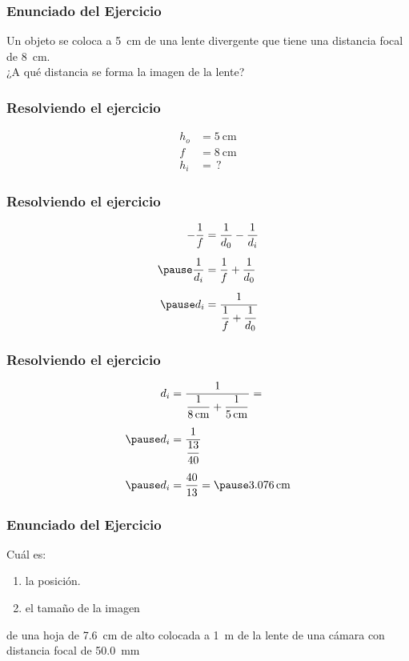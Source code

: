 \documentclass[14pt]{beamer}
\begin{document}
\begin{frame}
\frametitle{Enunciado del Ejercicio}
Un objeto se coloca a \SI{5}{\centi\meter} de una lente divergente que tiene una distancia focal de \SI{8}{\centi\meter}.
\\
\bigskip
\pause
¿A qué distancia se forma la imagen de la lente?
\end{frame}
\begin{frame}
\frametitle{Resolviendo el ejercicio}
\pause
\begin{align*}
h_{o} &= \SI{5}{\centi\meter} \\
f &= \SI{8}{\centi\meter} \\
h_{i} &= \, ?
\end{align*}
\end{frame}
\begin{frame}
\frametitle{Resolviendo el ejercicio}
\pause
\begin{eqnarray*}
\begin{aligned}
- \dfrac{1}{f} &= \dfrac{1}{d_{0}} - \dfrac{1}{d_{i}} \\[0.5em] \pause
\dfrac{1}{d_{i}} &= \dfrac{1}{f} + \dfrac{1}{d_{0}} \\[0.5em] \pause
d_{i} &= \dfrac{1}{\dfrac{1}{f} + \dfrac{1}{d_{0}}} 
\end{aligned}
\end{eqnarray*}
\end{frame}
\begin{frame}
\frametitle{Resolviendo el ejercicio}
\pause
\begin{eqnarray*}
\begin{aligned}
d_{i} &= \dfrac{1}{\dfrac{1}{\SI{8}{\centi\meter}} + \dfrac{1}{\SI{5}{\centi\meter}}} = \\[0.5em] \pause 
d_{i} &= \dfrac{1}{\dfrac{13}{40}} \\[0.5em] \pause 
d_{i} &= \dfrac{40}{13} = \pause \SI{3.076}{\centi\meter}
\end{aligned}
\end{eqnarray*}
\end{frame}
\begin{frame}
\frametitle{Enunciado del Ejercicio}
Cuál es:
\begin{enumerate}[<+->]
\item la posición.
\item el tamaño de la imagen
\end{enumerate}
\pause
de una hoja de \SI{7.6}{\centi\meter} de alto colocada a \SI{1}{\meter} de la lente de una cámara con distancia focal de \SI{50.0}{\milli\meter}
\end{frame}
\end{document}
